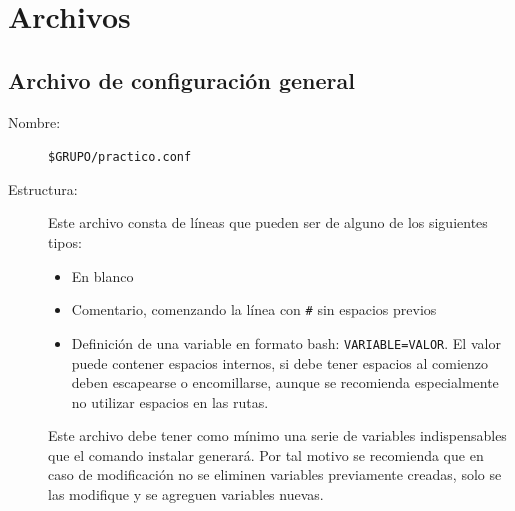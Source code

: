 \documentclass[12pt]{article}
\begin{document}
\section{Archivos}
\subsection{Archivo de configuración general}
\begin{description}
	\item [Nombre:] \verb|$GRUPO/practico.conf|
	\item [Estructura:] Este archivo consta de líneas que pueden ser de alguno de los siguientes tipos:
	\begin{itemize}
		\item En blanco
		\item Comentario, comenzando la línea con \verb|#| sin espacios previos
		\item Definición de una variable en formato bash: \verb|VARIABLE=VALOR|. El valor puede contener espacios internos, si debe tener espacios al comienzo deben escapearse o encomillarse, aunque se recomienda especialmente no utilizar espacios en las rutas.
	\end{itemize}
	Este archivo debe tener como mínimo una serie de variables indispensables que el comando instalar generará. Por tal motivo se recomienda que en caso de modificación no se eliminen variables previamente creadas, solo se las modifique y se agreguen variables nuevas.
\end{description}
\end{document}
